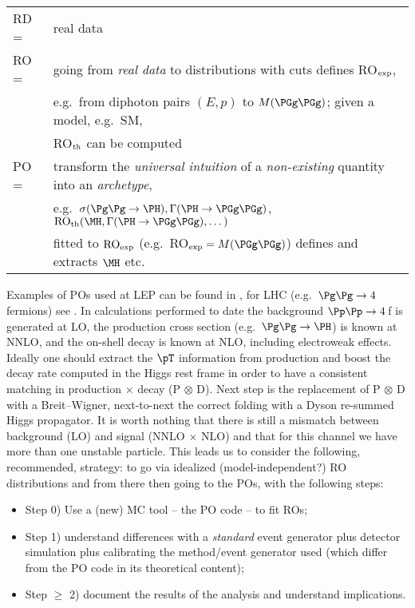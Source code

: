 \begin{table}[h!]\centering
\setlength{\arraycolsep}{\tabcolsep}
\renewcommand\arraystretch{1.2}
\begin{tabular}{|l|l|}
\hline 
RD = & real data \\
RO = & going from {\em real data} to distributions with cuts 
             defines RO$_{\rm exp}$, \\
           & e.g.\ from diphoton pairs $(E, p)$ to 
             $M(\PGg\PGg)$; given a model, e.g.\ SM, \\
          &   RO$_{\rm th}$ can be computed\\
PO = & transform the {\em universal intuition} of a 
             {\em non-existing} quantity into an {\em archetype}, \\
{}         & e.g.\ $\sigma(\Pg\Pg \to \PH), \Gamma(\PH \to \PGg \PGg)$, 
             $\mbox{RO}_{\rm th}(\MH, 
             \Gamma(\PH \to \PGg \PGg), \dots)$ \\
{}         & fitted to $\mbox{RO}_{\rm exp}$ (e.g.\ RO${}_{\rm exp} 
             = M(\PGg\PGg)$) 
             defines and extracts $\MH$ etc. \\
\hline
\end{tabular}
\label{Gloss}
\end{table}
Examples of POs used at LEP can be found in , for LHC
(e.g.\ $\Pg\Pg \to 4\,$fermions) see .
In calculations performed to date the background 
$\Pp \Pp \to 4\,$f is generated at
LO, the production cross section (e.g.\ $\Pg\Pg \to \PH$) is known at NNLO, 
and the on-shell decay is known at NLO, including electroweak effects. Ideally 
one should extract the $\pT$ information from production and boost the decay 
rate computed in the Higgs rest frame in order to have a consistent matching in
production$\,\times\,$decay (P$\,\otimes\,$D). Next step is the 
replacement of P$\,\otimes\,$D with a Breit--Wigner, next-to-next the correct 
folding with a Dyson re-summed Higgs propagator. It is worth nothing that there 
is still a mismatch between background (LO) and signal (NNLO$\,\times\,$NLO) 
and that for this channel we have more than one unstable particle.
This leads us to consider the following, recommended, strategy: 
to go via idealized (model-independent?) RO distributions and from 
there then going to the POs, with the following steps:
\begin{itemize}

\item {Step 0)} Use a (new) MC tool -- the PO code -- to fit ROs;

\item {Step 1)} understand differences with a {\em standard} event generator 
plus detector simulation plus calibrating the method/event 
generator used (which differ from the PO code in its theoretical content);

\item {Step $\ge$ 2)} document the results of the analysis and understand 
implications.

\end{itemize}
